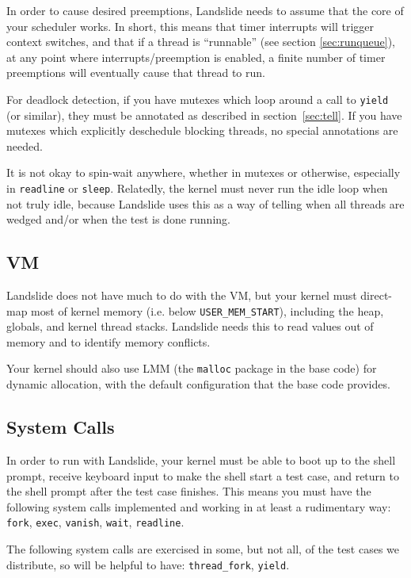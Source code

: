 \documentclass{article}
\begin{document}
In order to cause desired preemptions, Landslide needs to assume that the core of your scheduler works. In short, this means that timer interrupts will trigger context switches, and that if a thread is ``runnable'' (see section \ref{sec:runqueue}), at any point where interrupts/preemption is enabled, a finite number of timer preemptions will eventually cause that thread to run.

For deadlock detection, if you have mutexes which loop around a call to \texttt{yield} (or similar), they must be annotated as described in section~\ref{sec:tell}. If you have mutexes which explicitly deschedule blocking threads, no special annotations are needed.

It is not okay to spin-wait anywhere, whether in mutexes or otherwise, especially in \texttt{readline} or \texttt{sleep}. Relatedly, the kernel must never run the idle loop when not truly idle, because Landslide uses this as a way of telling when all threads are wedged and/or when the test is done running.

\subsection{VM}

Landslide does not have much to do with the VM, but your kernel must direct-map most of kernel memory (i.e. below \texttt{USER\_MEM\_START}), including the heap, globals, and kernel thread stacks. Landslide needs this to read values out of memory and to identify memory conflicts.

Your kernel should also use LMM (the \texttt{malloc} package in the base code) for dynamic allocation, with the default configuration that the base code provides.

\subsection{System Calls}

In order to run with Landslide, your kernel must be able to boot up to the shell prompt, receive keyboard input to make the shell start a test case, and return to the shell prompt after the test case finishes. This means you must have the following system calls implemented and working in at least a rudimentary way:
\texttt{fork}, \texttt{exec}, \texttt{vanish}, \texttt{wait}, \texttt{readline}.

The following system calls are exercised in some, but not all, of the test cases we distribute, so will be helpful to have:
\texttt{thread\_fork}, \texttt{yield}.
\end{document}
